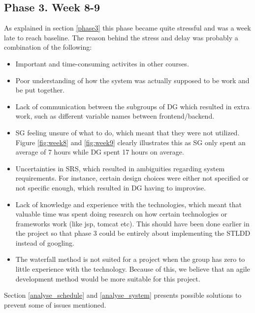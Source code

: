 \documentclass{article}
\begin{document}
    \subsection{Phase 3. Week 8-9 \label{analys_phase3}}
        As explained in section \ref{phase3} this phase became quite stressful and 
        was a week late to reach baseline. The reason behind the stress and delay was
        probably a combination of the following:
        \begin{itemize}
            \item Important and time-consuming activites in other courses.
            \item Poor understanding of how the system was actually supposed to be work and
                    be put together.
            \item Lack of communication between the subgroups of DG which resulted in
                    extra work, such as different variable names between frontend/backend. %
            \item SG feeling unsure of what to do, which meant that they were not utilized.
                    Figure \ref{fig:week8} and \ref{fig:week9} clearly illustrates this as
                    SG only spent an average of 7 hours while DG spent 17 hours on average.
            \item Uncertainties in SRS, which resulted in ambiguities regarding system requirements.
                    For instance, certain design choices were either not specified or not
                    specific enough, which resulted in DG having to improvise.
            \item Lack of knowledge and experience with the technologies, which meant that valuable time
                    was spent doing research on how certain technologies or frameworks work (like jsp, tomcat etc). This should have been done earlier in the project so that phase 3 could be entirely about implementing the STLDD instead of googling.
            \item The waterfall method is not suited for a project when the group has zero to little experience with the technology. Because of this, we believe that an agile development method would be more suitable for this project.
        \end{itemize}
        \noindent
        Section \ref{analyse_schedule} and \ref{analyse_system} presents possible solutions to prevent some of issues mentioned.
    
\end{document}
